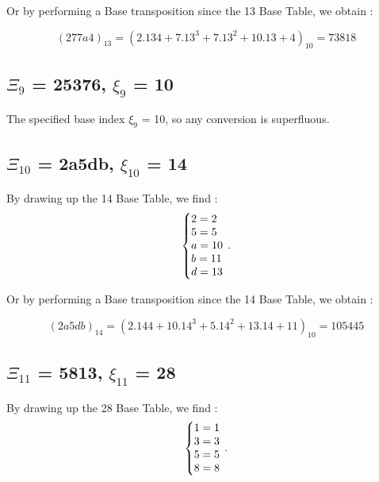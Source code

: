 \documentclass[letterpaper,10pt,english]{sphinxmanual}
\begin{document}
\begin{flushleft}
  Or by performing a Base transposition since the 13 Base Table, we obtain :
\end{flushleft}
\begin{equation}
(277a4)_{13}=(2.13{4}+7.13^{3}+7.13^{2}+10.13+4)_{10}=73818
\end{equation}

\subsection{$\Xi_{9}$ = 25376, $\xi_{9}$ = 10}
The specified base index $\xi_{9}$ = 10, so any conversion is superfluous.

\subsection{$\Xi_{10}$ = 2a5db, $\xi_{10}$ = 14}
By drawing up the 14 Base Table, we find :
\begin{equation}
\centering
\left\{\begin{array}{@{}l@{}}
2=2 \\
5=5 \\
a=10 \\
b=11 \\
d=13 \\
\end{array}\right.\,.
\end{equation}

\begin{flushleft}
  Or by performing a Base transposition since the 14 Base Table, we obtain :
\end{flushleft}
\begin{equation}
(2a5db)_{14}=(2.14{4}+10.14^{3}+5.14^{2}+13.14+11)_{10}=105 445
\end{equation}

\subsection{$\Xi_{11}$ = 5813, $\xi_{11}$ = 28}
By drawing up the 28 Base Table, we find :
\begin{equation}
\centering
\left\{\begin{array}{@{}l@{}}
1=1 \\
3=3 \\
5=5 \\
8=8 \\

\end{array}\right.\,.
\end{equation}
\end{document}
